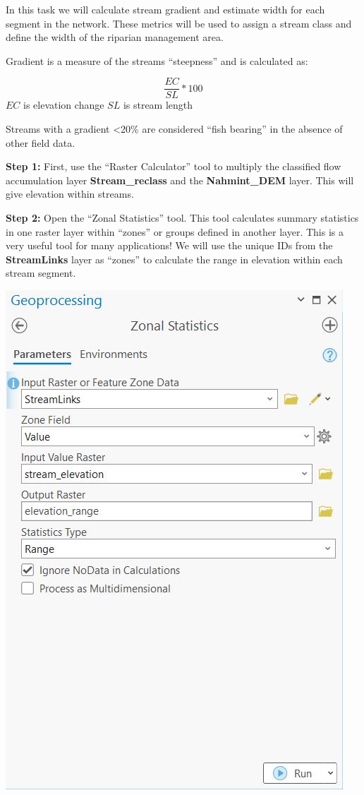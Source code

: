 \documentclass[
]{book}
\begin{document}
In this task we will calculate stream gradient and estimate width for each segment in the network. These metrics will be used to assign a stream class and define the width of the riparian management area.

Gradient is a measure of the streams ``steepness'' and is calculated as:

\[
\frac{EC}{SL}*100
\] \(EC\) is elevation change \(SL\) is stream length

Streams with a gradient \textless20\% are considered ``fish bearing'' in the absence of other field data.

\textbf{Step 1:} First, use the ``Raster Calculator'' tool to multiply the classified flow accumulation layer \textbf{Stream\_reclass} and the \textbf{Nahmint\_DEM} layer. This will give elevation within streams.

\textbf{Step 2:} Open the ``Zonal Statistics'' tool. This tool calculates summary statistics in one raster layer within ``zones'' or groups defined in another layer. This is a very useful tool for many applications! We will use the unique IDs from the \textbf{StreamLinks} layer as ``zones'' to calculate the range in elevation within each stream segment.

\includegraphics[width=0.75\linewidth]{images/03-zonal-statistics}
\end{document}
